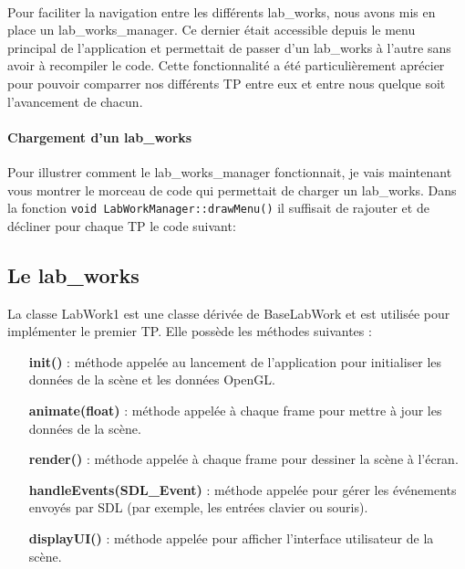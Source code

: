 \documentclass[10pt,a4paper]{article}
\begin{document}
		\paragraph{}Pour faciliter la navigation entre les différents lab\_works, nous avons mis en place un lab\_works\_manager. Ce dernier était accessible depuis le menu principal de l'application et permettait de passer d'un lab\_works à l'autre sans avoir à recompiler le code. Cette fonctionnalité a été particulièrement aprécier pour pouvoir comparrer nos différents TP entre eux et entre nous quelque soit l'avancement de chacun.

		\paragraph{Chargement d'un lab\_works} %
			Pour illustrer comment le lab\_works\_manager fonctionnait, je vais maintenant vous montrer le morceau de code qui permettait de charger un lab\_works. Dans la fonction \texttt{void LabWorkManager::drawMenu()} il suffisait de rajouter et de décliner pour chaque TP le code suivant:

			
			
		

	\subsection{Le lab\_works} %
		La classe LabWork1 est une classe dérivée de BaseLabWork et est utilisée pour implémenter le premier TP. Elle possède les méthodes suivantes :

		\begin{itemize}
			\item[\textbf{init()}] : méthode appelée au lancement de l'application pour initialiser les données de la scène et les données OpenGL.
			\item[\textbf{animate(float)}] : méthode appelée à chaque frame pour mettre à jour les données de la scène.
			\item[\textbf{render()}] : méthode appelée à chaque frame pour dessiner la scène à l'écran.
			\item[\textbf{handleEvents(SDL\_Event)}] : méthode appelée pour gérer les événements envoyés par SDL (par exemple, les entrées clavier ou souris).
			\item[\textbf{displayUI()}] : méthode appelée pour afficher l'interface utilisateur de la scène.
		\end{itemize}
		
\end{document}
